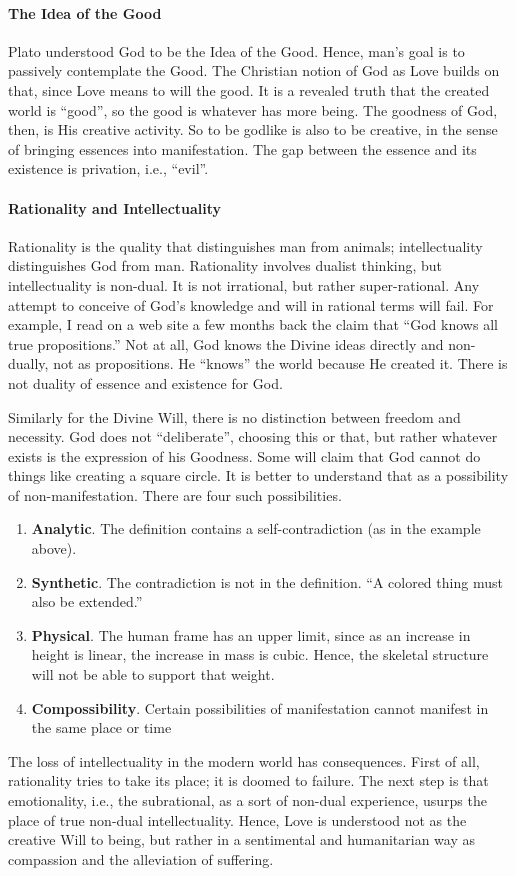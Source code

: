 \paragraph{The Idea of the Good}
Plato understood God to be the Idea of the Good. Hence, man's goal is to passively contemplate the Good. The Christian notion of God as Love builds on that, since Love means to will the good. It is a revealed truth that the created world is “good”, so the good is whatever has more being. The goodness of God, then, is His creative activity. So to be godlike is also to be creative, in the sense of bringing essences into manifestation. The gap between the essence and its existence is privation, i.e., “evil”.

\paragraph{Rationality and Intellectuality}
Rationality is the quality that distinguishes man from animals; intellectuality distinguishes God from man. Rationality involves dualist thinking, but intellectuality is non-dual. It is not irrational, but rather super-rational. Any attempt to conceive of God's knowledge and will in rational terms will fail. For example, I read on a web site a few months back the claim that “God knows all true propositions.” Not at all, God knows the Divine ideas directly and non-dually, not as propositions. He “knows” the world because He created it. There is not duality of essence and existence for God.

Similarly for the Divine Will, there is no distinction between freedom and necessity. God does not “deliberate”, choosing this or that, but rather whatever exists is the expression of his Goodness. Some will claim that God cannot do things like creating a square circle. It is better to understand that as a possibility of non-manifestation. There are four such possibilities.

\begin{enumerate}
\item \textbf{Analytic}. The definition contains a self-contradiction (as in the example above). 
\item \textbf{Synthetic}. The contradiction is not in the definition. “A colored thing must also be extended.” 
\item \textbf{Physical}. The human frame has an upper limit, since as an increase in height is linear, the increase in mass is cubic. Hence, the skeletal structure will not be able to support that weight. 
\item \textbf{Compossibility}. Certain possibilities of manifestation cannot manifest in the same place or time 
\end{enumerate}
The loss of intellectuality in the modern world has consequences. First of all, rationality tries to take its place; it is doomed to failure. The next step is that emotionality, i.e., the subrational, as a sort of non-dual experience, usurps the place of true non-dual intellectuality. Hence, Love is understood not as the creative Will to being, but rather in a sentimental and humanitarian way as compassion and the alleviation of suffering.

